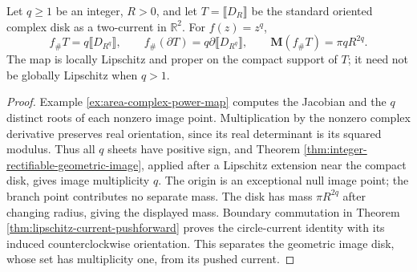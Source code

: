 \begin{example}\label{ex:current-complex-power-disk}
Let $q\geq1$ be an integer, $R>0$, and let $T=\llbracket D_R\rrbracket$ be the standard oriented complex disk as a two-current in $\mathbb R^2$. For $f(z)=z^q$,
\[
 f_\#T=q\llbracket D_{R^q}\rrbracket,
 \qquad f_\#(\partial T)=q\partial\llbracket D_{R^q}\rrbracket,
 \qquad \mathbf M(f_\#T)=\pi qR^{2q}.
\]
The map is locally Lipschitz and proper on the compact support of $T$; it need not be globally Lipschitz when $q>1$.
\end{example}
\begin{proof}
Example \ref{ex:area-complex-power-map} computes the Jacobian and the $q$ distinct roots of each nonzero image point. Multiplication by the nonzero complex derivative preserves real orientation, since its real determinant is its squared modulus. Thus all $q$ sheets have positive sign, and Theorem \ref{thm:integer-rectifiable-geometric-image}, applied after a Lipschitz extension near the compact disk, gives image multiplicity $q$. The origin is an exceptional null image point; the branch point contributes no separate mass. The disk has mass $\pi R^{2q}$ after changing radius, giving the displayed mass. Boundary commutation in Theorem \ref{thm:lipschitz-current-pushforward} proves the circle-current identity with its induced counterclockwise orientation. This separates the geometric image disk, whose set has multiplicity one, from its pushed current.
\end{proof}

